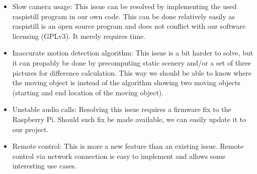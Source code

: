 \documentclass[english,11pt,twoside,a4paper]{article}
\begin{document}
\begin{itemize}
  \item Slow camera usage: This issue can be resolved by implementing the used raspistill program in our own code. This can be done relatively easily as raspistill is an open source program and does not conflict with our software licensing (GPLv3). It merely requires time.
  \item Inaccurate motion detection algorithm: This issue is a bit harder to solve, but it can propably be done by precomputing static scenery and/or a set of three pictures for difference calculation. This way we should be able to know where the moving object is instead of the algorithm showing two moving objects (starting and end location of the moving object).
  \item Unstable audio calls: Resolving this issue requires a firmware fix to the Raspberry Pi. Should such fix be made available, we can easily update it to our project.
  \item Remote control: This is more a new feature than an existing issue. Remote control via network connection is easy to implement and allows some interesting use cases.
\end{itemize}
\end{document}
